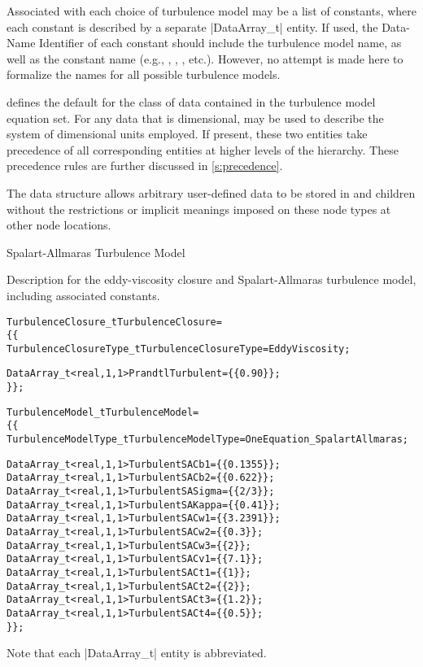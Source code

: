Associated with each choice of turbulence model may be a list of constants,
where each constant is described by a separate |DataArray_t| entity.
If used, the Data-Name Identifier of each constant should include the
turbulence model name, as well as the constant name (e.g.,
, , ,
etc.).
However, no attempt is made here to formalize the names for all possible
turbulence models.

 defines the default for the class of data contained in the
turbulence model equation set.
For any data that is dimensional,  may be used to
describe the system of dimensional units employed.
If present, these two entities take precedence of all corresponding
entities at higher levels of the hierarchy.
These precedence rules are further discussed in \autoref{s:precedence}.

The  data structure allows arbitrary
user-defined data to be stored in  and
 children without the restrictions or implicit
meanings imposed on these node types at other node locations.

\begin{example}{Spalart-Allmaras Turbulence Model}

Description for the eddy-viscosity closure and Spalart-Allmaras
turbulence model, including associated constants.
\begin{alltt}
  TurbulenceClosure\_t TurbulenceClosure =
    \{\{
    TurbulenceClosureType\_t TurbulenceClosureType = EddyViscosity ;

    DataArray\_t<real, 1, 1> PrandtlTurbulent = \{\{ 0.90 \}\} ;
    \}\} ;

  TurbulenceModel\_t TurbulenceModel = 
    \{\{
    TurbulenceModelType\_t TurbulenceModelType = OneEquation\_SpalartAllmaras ;

    DataArray\_t<real, 1, 1> TurbulentSACb1   = \{\{ 0.1355 \}\} ;
    DataArray\_t<real, 1, 1> TurbulentSACb2   = \{\{ 0.622 \}\} ;
    DataArray\_t<real, 1, 1> TurbulentSASigma = \{\{ 2/3 \}\} ;
    DataArray\_t<real, 1, 1> TurbulentSAKappa = \{\{ 0.41 \}\} ;
    DataArray\_t<real, 1, 1> TurbulentSACw1   = \{\{ 3.2391 \}\} ;
    DataArray\_t<real, 1, 1> TurbulentSACw2   = \{\{ 0.3 \}\} ;
    DataArray\_t<real, 1, 1> TurbulentSACw3   = \{\{ 2 \}\} ;
    DataArray\_t<real, 1, 1> TurbulentSACv1   = \{\{ 7.1 \}\} ;
    DataArray\_t<real, 1, 1> TurbulentSACt1   = \{\{ 1 \}\} ;
    DataArray\_t<real, 1, 1> TurbulentSACt2   = \{\{ 2 \}\} ;
    DataArray\_t<real, 1, 1> TurbulentSACt3   = \{\{ 1.2 \}\} ;
    DataArray\_t<real, 1, 1> TurbulentSACt4   = \{\{ 0.5 \}\} ;
    \}\} ;
\end{alltt}
Note that each |DataArray_t| entity is abbreviated.
\end{example}

